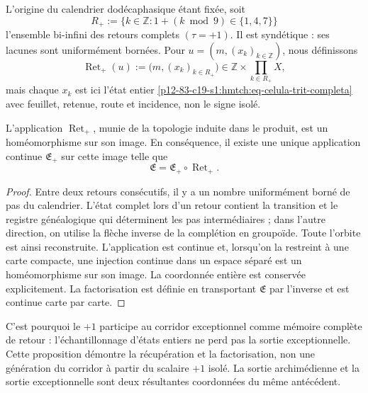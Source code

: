 L'origine du calendrier dodécaphasique étant fixée, soit
\[
 R_+:=\{k\in\mathbb Z:1+(k\bmod 9)\in\{1,4,7\}\}
\]
l'ensemble bi-infini des retours complets \((\tau=+1)\). Il est syndétique :
ses lacunes sont uniformément bornées. Pour
\(u=(m,(x_k)_{k\in\mathbb Z})\), nous définissons
\[
 \operatorname{Ret}_+(u)
 :=\bigl(m,(x_k)_{k\in R_+}\bigr)
 \in\mathbb Z\times\prod_{k\in R_+}X,
\]
mais chaque \(x_k\) est ici l'état entier
\eqref{p12-83-c19-s1:hmtch:eq-celula-trit-completa} avec feuillet, retenue, route et incidence,
non le signe isolé.

\begin{proposition}
\label{p12-83-c17-s7:hmtch:prop-retorno-reconstruye}
L'application \(\operatorname{Ret}_+\), munie de la topologie induite dans le
produit, est un homéomorphisme sur son image.
En conséquence, il existe une unique application continue
\(\mathfrak E_+\) sur cette image telle que
\begin{equation}
 \mathfrak E=\mathfrak E_+\circ\operatorname{Ret}_+.
 \label{p12-83-c17-s7:hmtch:eq-factorizacion-excepcional-retorno}
\end{equation}
\end{proposition}

\begin{proof}
Entre deux retours consécutifs, il y a un nombre uniformément borné de pas
du calendrier. L'état complet lors d'un retour contient la transition et
le registre généalogique qui déterminent les pas intermédiaires ; dans l'autre direction, on
utilise la flèche inverse de la complétion en groupoïde. Toute
l'orbite est ainsi reconstruite. L'application est continue et, lorsqu'on la restreint à une carte
compacte, une injection continue dans un espace séparé est un
homéomorphisme sur son image. La coordonnée entière est conservée
explicitement. La factorisation est définie en transportant \(\mathfrak E\) par
l'inverse et est continue carte par carte.
\end{proof}

C'est pourquoi le \(+1\) participe au corridor exceptionnel comme mémoire complète
de retour : l'échantillonnage d'états entiers ne perd pas la sortie exceptionnelle.
Cette proposition démontre la récupération et la factorisation, non une génération
du corridor à partir du scalaire \(+1\) isolé. La sortie archimédienne et la
sortie exceptionnelle sont deux résultantes coordonnées du même antécédent.
